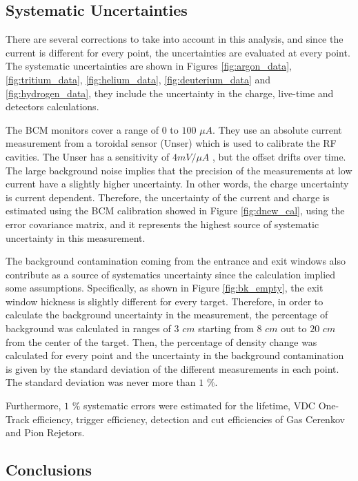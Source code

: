 \documentclass[final,5p,times,twocolumn]{elsarticle}
\begin{document}
\subsection{Systematic Uncertainties}

There are several corrections to take into account in this analysis, and since the current is different for every point, the uncertainties are evaluated at every point.  The systematic uncertainties are shown in Figures  \ref{fig:argon_data}, \ref{fig:tritium_data}, \ref{fig:helium_data}, \ref{fig:deuterium_data} and \ref{fig:hydrogen_data},  they   include the uncertainty in the charge, live-time and detectors calculations.

The BCM monitors cover a range of $0$ to $100$ $\mu A$. They use an absolute current measurement from a toroidal sensor (Unser) which is used to calibrate the RF cavities.  The Unser has a sensitivity of $4 mV/ \mu A$ \citep{denard}, but the offset drifts over time. The large background noise implies that the precision of the measurements at low current have a slightly higher uncertainty. In other words, the charge uncertainty is current dependent. Therefore, the uncertainty of the current and charge is estimated using the BCM calibration showed in Figure \ref{fig:dnew_cal}, using the error covariance matrix, and it represents the highest source of systematic uncertainty in this measurement.


The background contamination coming from the entrance and exit windows also contribute as a source of systematics uncertainty since the calculation implied some assumptions. Specifically, as shown in Figure \ref{fig:bk_empty}, the exit window hickness is slightly different for every target. Therefore, in order to calculate the background uncertainty in the measurement, the percentage of background was calculated in ranges of $3$ $cm$ starting from $8$ $cm$ out to $20$ $cm$ from the center of the target. Then, the percentage of density change was calculated for every point and the uncertainty in the background contamination is given by the standard deviation of the different measurements in each point. The standard deviation was never more than $1$ $\% $.

Furthermore, $1$ $\% $ systematic errors were estimated for the lifetime, VDC One-Track efficiency, trigger efficiency, detection and cut efficiencies of Gas Cerenkov and Pion Rejetors.

\subsection {Conclusions }
\end{document}
